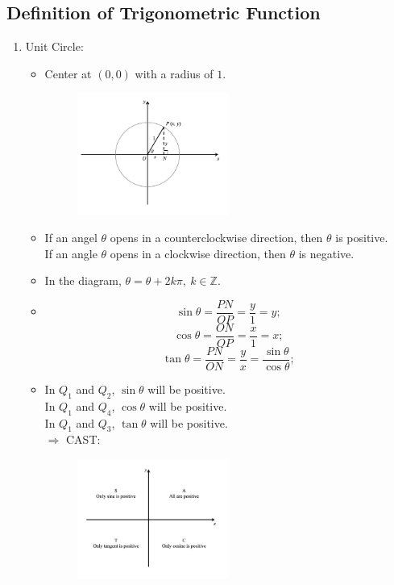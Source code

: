 \documentclass[12pt, a4paper]{article}
\def\Z{{\mathbb{Z}}}
\begin{document}
\subsection{Definition of Trigonometric Function}
\begin{enumerate}
  \item Unit Circle: 
  \begin{itemize}
    \item Center at $(0,0)$ with a radius of $1$.
    \begin{figure}[H]
      \centering
      \includegraphics[width=0.5\textwidth]{Fig.3.22.jpg}
    \end{figure}
    \item If an angel $\theta$ opens in a counterclockwise direction, then $\theta$ is positive. \\
    If an angle $\theta$ opens in a clockwise direction, then $\theta$ is negative. 
    \item In the diagram, $\theta=\theta+2k\pi,\ k\in\Z.$
    \item $$\sin\theta=\frac{PN}{OP}=\frac{y}{1}=y; $$
    $$\cos\theta=\frac{ON}{OP}=\frac{x}{1}=x; $$
    $$\tan\theta=\frac{PN}{ON}=\frac{y}{x}=\frac{\sin\theta}{\cos\theta}; $$
    \item In $Q_1$ and $Q_2$, $\sin\theta$ will be positive.\\
    In $Q_1$ and $Q_4$, $\cos\theta$ will be positive.\\
    In $Q_1$ and $Q_3$, $\tan\theta$ will be positive.\\
    $\Rightarrow$ CAST: 
    \begin{figure}[H]
      \centering
      \includegraphics[width=0.5\textwidth]{Fig.3.23.jpg}

\end{figure}
\end{itemize}
\end{enumerate}
\end{document}
